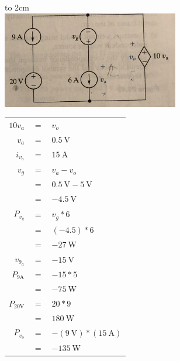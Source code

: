 \documentclass[a4paper]{article}
\begin{document}
\begin{itemize}
	      \hbox to 2cm{} \\	  
	      \includegraphics{P2-9.png} \\
	      \begin{tabular}{r c l}
	      	$10v_{a}$           & $=$ & $v_{o}$                                 \\
	      	$v_{a}$             & $=$ & $\SI{0.5}{\volt}$                       \\
	      	$i_{v_{a}}$         & $=$ & $\SI{15}{\ampere}$                      \\
	      	$v_{g}$             & $=$ & $v_{a} - v_{o}$                         \\
	      	                    & $=$ & $\SI{0.5}{\volt} - \SI{5}{\volt}$       \\
	      	                    & $=$ & $\SI{-4.5}{\volt}$                      \\
	      	$P_{v_{g}}$         & $=$ & $v_{g} * 6$                             \\
	      	                    & $=$ & $(-4.5) * 6$                            \\
	      	                    & $=$ & $\SI{-27}{\watt}$                       \\
	      	$v_{9_{a}}$         & $=$ & $\SI{-15}{\volt}$                       \\
	      	$P_{9\si{\ampere}}$ & $=$ & $-15 * 5$                               \\
	      	                    & $=$ & $\SI{-75}{\watt}$                       \\
	      	$P_{20\si{\volt}}$  & $=$ & $20 * 9$                                \\
	      	                    & $=$ & $\SI{180}{\watt}$                       \\
	      	$P_{v_{o}}$         & $=$ & $-(\SI{9}{\volt}) * (\SI{15}{\ampere})$ \\
	      	                    & $=$ & $\SI{-135}{\watt}$                      \\                                        

\end{tabular}
\end{itemize}
\end{document}
